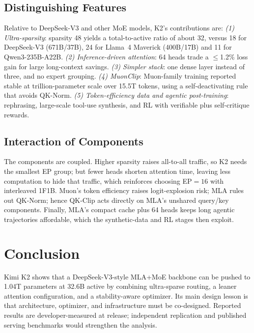 \documentclass[10pt,twocolumn,letterpaper]{article}
\begin{document}
\subsection{Distinguishing Features}
Relative to DeepSeek-V3 and other MoE models, K2's contributions are:
\emph{(1) Ultra-sparsity}: sparsity 48 yields a total-to-active ratio of about 32, versus 18 for DeepSeek-V3 (671B/37B), 24 for Llama~4 Maverick (400B/17B) and 11 for Qwen3-235B-A22B. 
\emph{(2) Inference-driven attention}: 64 heads trade a $\le$1.2\% loss gain for large long-context savings. 
\emph{(3) Simpler stack}: one dense layer instead of three, and no expert grouping. 
\emph{(4) MuonClip}: Muon-family training reported stable at trillion-parameter scale over 15.5T tokens, using a self-deactivating rule that avoids QK-Norm. 
\emph{(5) Token-efficiency data and agentic post-training}: rephrasing, large-scale tool-use synthesis, and RL with verifiable plus self-critique rewards.

\subsection{Interaction of Components}
The components are coupled. Higher sparsity raises all-to-all traffic, so K2 needs the smallest EP group; but fewer heads shorten attention time, leaving less computation to hide that traffic, which reinforces choosing EP${=}16$ with interleaved 1F1B. Muon's token efficiency raises logit-explosion risk; MLA rules out QK-Norm; hence QK-Clip acts directly on MLA's unshared query/key components. Finally, MLA's compact cache plus 64 heads keeps long agentic trajectories affordable, which the synthetic-data and RL stages then exploit.

\section{Conclusion}
Kimi K2 shows that a DeepSeek-V3-style MLA+MoE backbone can be pushed to 1.04T parameters at 32.6B active by combining ultra-sparse routing, a leaner attention configuration, and a stability-aware optimizer. Its main design lesson is that architecture, optimizer, and infrastructure must be co-designed. Reported results are developer-measured at release; independent replication and published serving benchmarks would strengthen the analysis.
\end{document}
